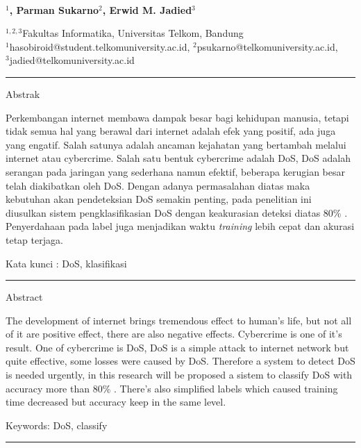  
  \begin{center}
      \textbf{\large \Title}\\
      \bigskip 
  \end{center}
  
  
  
   \begin{center}
     \bf \Author$^1$, Parman Sukarno$^2$, Erwid M. Jadied$^3$ 
  \end{center}
  
  
   \begin{center}
     $^{1,2,3}$Fakultas Informatika, Universitas Telkom, Bandung\\
$^1$hasobiroid@student.telkomuniversity.ac.id, $^2$psukarno@telkomuniversity.ac.id,\\ $^3$jadied@telkomuniversity.ac.id %
  \end{center}
  
   
   
{\bf \parindent0pt \noindent\rule{\textwidth}{1pt}
Abstrak

Perkembangan internet membawa dampak besar bagi kehidupan manusia, tetapi tidak semua hal yang berawal dari internet adalah efek yang positif, ada juga yang engatif. Salah satunya adalah ancaman kejahatan yang bertambah melalui internet atau cybercrime. Salah satu bentuk cybercrime adalah DoS, DoS adalah serangan pada jaringan yang sederhana namun efektif, beberapa kerugian besar telah diakibatkan oleh DoS. Dengan adanya permasalahan diatas maka kebutuhan akan pendeteksian DoS semakin penting, pada penelitian ini diusulkan sistem pengklasifikasian DoS dengan keakurasian deteksi diatas 80\% \cite{ddosfuzzy}\cite{ddosfpga}\cite{ddosrbf}. Penyerdahaan pada label juga menjadikan waktu \textit{training} lebih cepat dan akurasi tetap terjaga.

 \bigskip
Kata kunci : DoS, klasifikasi




\noindent\rule{\textwidth}{1pt}
Abstract

The development of internet brings tremendous effect to human's life, but not all of it are positive effect, there are also negative effects. Cybercrime is one of it's result. One of cybercrime is DoS, DoS is a simple attack to internet network but quite effective, some losses were caused by DoS. Therefore a system to detect DoS is needed urgently, in this research will be proposed a sistem to classify DoS with accuracy more than 80\% \cite{ddosfuzzy}\cite{ddosfpga}\cite{ddosrbf}. There's also simplified labels which caused training time decreased but accuracy keep in the same level.

 \bigskip
Keywords: DoS, classify

\noindent\rule{\textwidth}{1pt} }



